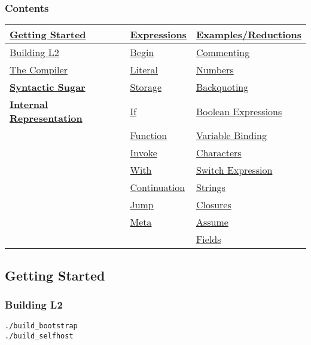 \documentclass[]{article}
\begin{document}
\subsubsection{Contents}\label{contents}

\begin{longtable}[]{@{}lll@{}}
\toprule
\textbf{\protect\hyperlink{getting-started}{Getting Started}} &
\protect\hyperlink{expressions}{Expressions} &
\protect\hyperlink{examplesreductions}{Examples/Reductions}\tabularnewline
\midrule
\endhead
\protect\hyperlink{building-l2}{Building L2} &
\protect\hyperlink{begin}{Begin} &
\protect\hyperlink{commenting}{Commenting}\tabularnewline
\protect\hyperlink{the-compiler}{The Compiler} &
\protect\hyperlink{literal}{Literal} &
\protect\hyperlink{numbers}{Numbers}\tabularnewline
\textbf{\protect\hyperlink{syntactic-sugar}{Syntactic Sugar}} &
\protect\hyperlink{storage}{Storage} &
\protect\hyperlink{backquoting}{Backquoting}\tabularnewline
\textbf{\protect\hyperlink{internal-representation}{Internal
Representation}} & \protect\hyperlink{if}{If} &
\protect\hyperlink{boolean-expressions}{Boolean
Expressions}\tabularnewline
& \protect\hyperlink{function}{Function} &
\protect\hyperlink{variable-binding}{Variable Binding}\tabularnewline
& \protect\hyperlink{invoke}{Invoke} &
\protect\hyperlink{characters}{Characters}\tabularnewline
& \protect\hyperlink{with}{With} &
\protect\hyperlink{switch-expression}{Switch Expression}\tabularnewline
& \protect\hyperlink{continuation}{Continuation} &
\protect\hyperlink{strings}{Strings}\tabularnewline
& \protect\hyperlink{jump}{Jump} &
\protect\hyperlink{closures}{Closures}\tabularnewline
& \protect\hyperlink{meta}{Meta} &
\protect\hyperlink{assume}{Assume}\tabularnewline
& & \protect\hyperlink{fields}{Fields}\tabularnewline
\bottomrule
\end{longtable}

\hypertarget{getting-started}{\subsection{Getting
Started}\label{getting-started}}

\hypertarget{building-l2}{\subsubsection{Building
L2}\label{building-l2}}

\begin{verbatim}
./build_bootstrap
./build_selfhost
\end{verbatim}
\end{document}
